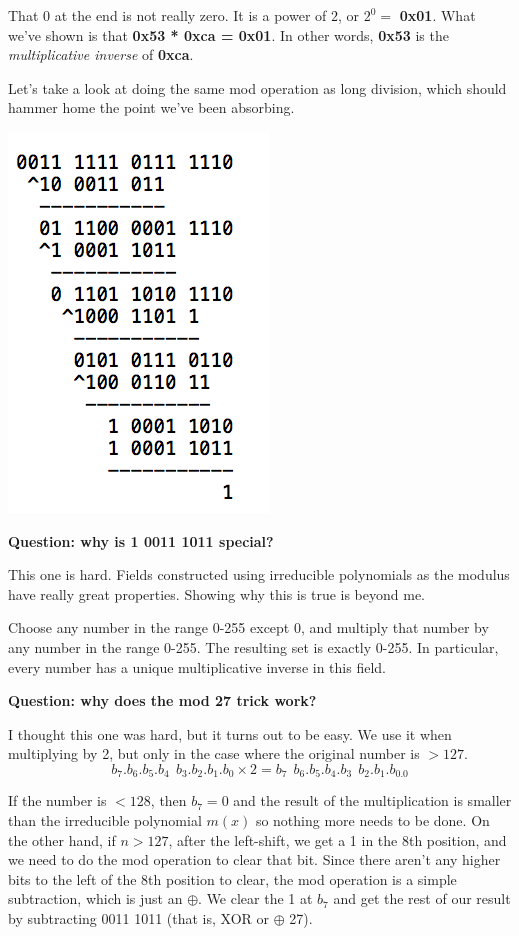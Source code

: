 \documentclass[11pt, oneside]{article}
\begin{document}
That $0$ at the end is not really zero.  It is a power of $2$, or $2^0 =$ \textbf{0x01}.  What we've shown is that  \textbf{0x53 * 0xca = 0x01}.  In other words, \textbf{0x53} is the \emph{multiplicative inverse} of \textbf{0xca}.

Let's take a look at doing the same mod operation as long division, which should hammer home the point we've been absorbing.
\begin{center} \includegraphics [scale=0.6] {figs/GFmath5.png} \end{center}

\textbf{Question:  why is 1 0011 1011 special?}

This one is hard.  Fields constructed using irreducible polynomials as the modulus have really great properties.  Showing why this is true is beyond me.

Choose any number in the range 0-255 except 0, and multiply that number by any number in the range 0-255.  The resulting set is exactly 0-255.  In particular, every number has a unique multiplicative inverse in this field.

\textbf{Question:  why does the mod 27 trick work?}

I thought this one was hard, but it turns out to be easy.  We use it when multiplying by 2, but only in the case where the original number is $> 127$.  
\[ b_7.b_6.b_5.b_4 \ \ b_3.b_2.b_1.b_0 \times 2 = b_7 \ \ b_6.b_5.b_4.b_3 \ \ b_2.b_1.b_0.0 \]

If the number is $< 128$, then $b_7 = 0$ and the result of the multiplication is smaller than the irreducible polynomial $m(x)$ so nothing more needs to be done.  On the other hand, if $n > 127$, after the left-shift, we get a 1 in the 8th position, and we need to do the mod operation to clear that bit.  Since there aren't any higher bits to the left of the 8th position to clear, the mod operation is a simple subtraction, which is just an $\oplus$.  We clear the 1 at $b_7$ and get the rest of our result by subtracting 0011 1011  (that is, XOR or $\oplus$ 27).
\end{document}
